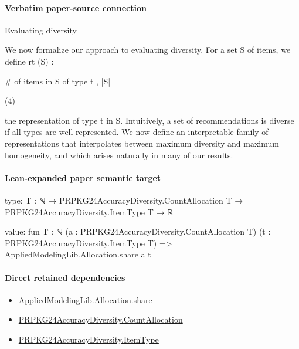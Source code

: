 \documentclass[10pt]{article}
\begin{document}
\paragraph{Verbatim paper-source connection}
\begin{ReviewVerbatim}
Evaluating diversity

We now formalize our approach to evaluating diversity. For a set S of items, we define
rt (S) :=

# of items in S of type t
,
|S|

(4)

the representation of type t in S. Intuitively, a set of recommendations is diverse if all types are well
represented. We now define an interpretable family of representations that interpolates between maximum
diversity and maximum homogeneity, and which arises naturally in many of our results.
\end{ReviewVerbatim}



\paragraph{Lean-expanded paper semantic target}
\begin{ReviewVerbatim}
type:
{T : ℕ} → PRPKG24AccuracyDiversity.CountAllocation T → PRPKG24AccuracyDiversity.ItemType T → ℝ

value:
fun {T : ℕ} (a : PRPKG24AccuracyDiversity.CountAllocation T) (t : PRPKG24AccuracyDiversity.ItemType T) =>
  AppliedModelingLib.Allocation.share a t
\end{ReviewVerbatim}

\paragraph{Direct retained dependencies}
\begin{itemize}\raggedright
\item \hyperlink{governing-declaration-d025e4eadb237351}{Applied\allowbreak{}Modeling\allowbreak{}Lib.\allowbreak{}Allocation.\allowbreak{}share}
\item \hyperlink{governing-declaration-4fbd8fa467bd5d78}{PRPKG24\allowbreak{}Accuracy\allowbreak{}Diversity.\allowbreak{}Count\allowbreak{}Allocation}
\item \hyperlink{governing-declaration-562ef32e180a12be}{PRPKG24\allowbreak{}Accuracy\allowbreak{}Diversity.\allowbreak{}Item\allowbreak{}Type}
\end{itemize}
\end{document}
